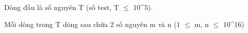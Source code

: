 Dòng đầu là số nguyên T (số test, T  $\le$  10^5).

Mỗi dòng trong T dòng sau chứa 2 số nguyên m và n (1  $\le$  m, n  $\le$  10^16)

\